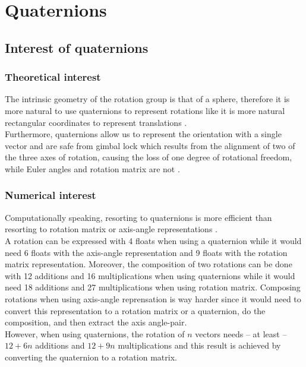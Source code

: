 \documentclass[class=report, float=false, crop=false]{standalone}
\begin{document}
\chapter{Quaternions}
\label{chap:quaternions}

\section{Interest of quaternions}

\subsection{Theoretical interest}

The intrinsic geometry of the rotation group is that of a sphere, therefore it is more natural to use quaternions to represent rotations like it is more natural rectangular coordinates to represent translations \cite{shoemake1985animating}.\\

Furthermore, quaternions allow us to represent the orientation with a single vector and are safe from gimbal lock which results from the alignment of two of the three axes of rotation, causing the loss of one degree of rotational freedom, while Euler angles and rotation matrix are not \cite{munjiza2009application}.

\subsection{Numerical interest}
\label{quaternions_interest}

Computationally speaking, resorting to quaternions is more efficient than resorting to rotation matrix or axis-angle representations \cite{eberly2002rotation}.\\

A rotation can be expressed with 4 floats when using a quaternion while it would need 6 floats with the axis-angle representation and 9 floats with the rotation matrix representation. Moreover, the composition of two rotations can be done with 12 additions and 16 multiplications when using quaternions while it would need 18 additions and 27 multiplications when using rotation matrix. Composing rotations when using axis-angle reprensation is way harder since it would need to convert this representation to a rotation matrix or a quaternion, do the composition, and then extract the axis angle-pair.\\

However, when using quaternions, the rotation of $n$ vectors needs -- at least \cite{eberly2002rotation} -- $12 + 6n$ additions and $12 + 9n$ multiplications and this result is achieved by converting the quaternion to a rotation matrix.\\
\end{document}
